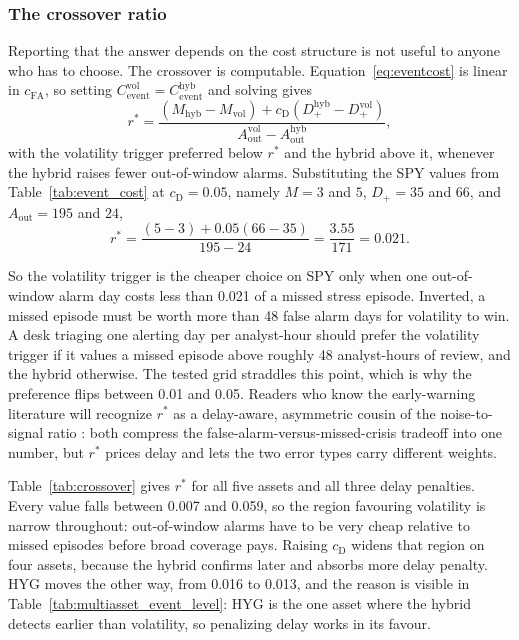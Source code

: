\documentclass[pdflatex,sn-mathphys-num,iicol]{sn-jnl}
\begin{document}
\subsubsection{The crossover ratio}
Reporting that the answer depends on the cost structure is not useful to anyone who has to choose. The crossover is computable. Equation~\eqref{eq:eventcost} is linear in $c_{\mathrm{FA}}$, so setting $C_{\mathrm{event}}^{\mathrm{vol}}=C_{\mathrm{event}}^{\mathrm{hyb}}$ and solving gives
\begin{equation}
\label{eq:crossover}
r^{*}=\frac{(M_{\mathrm{hyb}}-M_{\mathrm{vol}})+c_{\mathrm{D}}(D_{+}^{\mathrm{hyb}}-D_{+}^{\mathrm{vol}})}{A_{\mathrm{out}}^{\mathrm{vol}}-A_{\mathrm{out}}^{\mathrm{hyb}}},
\end{equation}
with the volatility trigger preferred below $r^{*}$ and the hybrid above it, whenever the hybrid raises fewer out-of-window alarms. Substituting the SPY values from Table~\ref{tab:event_cost} at $c_{\mathrm{D}}=0.05$, namely $M=3$ and $5$, $D_+=35$ and $66$, and $A_{\mathrm{out}}=195$ and $24$,
\begin{equation}
r^{*}=\frac{(5-3)+0.05(66-35)}{195-24}=\frac{3.55}{171}=0.021 .
\end{equation}

So the volatility trigger is the cheaper choice on SPY only when one out-of-window alarm day costs less than 0.021 of a missed stress episode. Inverted, a missed episode must be worth more than 48 false alarm days for volatility to win. A desk triaging one alerting day per analyst-hour should prefer the volatility trigger if it values a missed episode above roughly 48 analyst-hours of review, and the hybrid otherwise. The tested grid straddles this point, which is why the preference flips between 0.01 and 0.05. Readers who know the early-warning literature will recognize $r^{*}$ as a delay-aware, asymmetric cousin of the noise-to-signal ratio \cite{kaminsky1998}: both compress the false-alarm-versus-missed-crisis tradeoff into one number, but $r^{*}$ prices delay and lets the two error types carry different weights.

Table~\ref{tab:crossover} gives $r^{*}$ for all five assets and all three delay penalties. Every value falls between 0.007 and 0.059, so the region favouring volatility is narrow throughout: out-of-window alarms have to be very cheap relative to missed episodes before broad coverage pays. Raising $c_{\mathrm{D}}$ widens that region on four assets, because the hybrid confirms later and absorbs more delay penalty. HYG moves the other way, from 0.016 to 0.013, and the reason is visible in Table~\ref{tab:multiasset_event_level}: HYG is the one asset where the hybrid detects earlier than volatility, so penalizing delay works in its favour.
\end{document}

